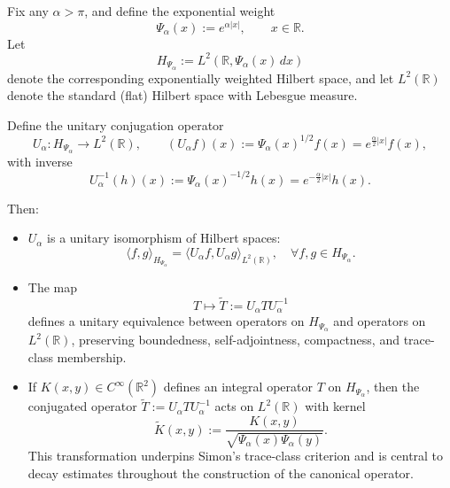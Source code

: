\begin{definition}
\label{def:unitary-conjugation-operator}
Fix any \( \alpha > \pi \), and define the exponential weight
\[
\Psi_\alpha(x) := e^{\alpha |x|}, \qquad x \in \mathbb{R}.
\]
Let
\[
H_{\Psi_\alpha} := L^2(\mathbb{R}, \Psi_\alpha(x)\, dx)
\]
denote the corresponding exponentially weighted Hilbert space, and let \( L^2(\mathbb{R}) \) denote the standard (flat) Hilbert space with Lebesgue measure.

Define the unitary conjugation operator
\[
U_\alpha \colon H_{\Psi_\alpha} \to L^2(\mathbb{R}), \qquad (U_\alpha f)(x) := \Psi_\alpha(x)^{1/2} f(x) = e^{\frac{\alpha}{2}|x|} f(x),
\]
with inverse
\[
U_\alpha^{-1}(h)(x) := \Psi_\alpha(x)^{-1/2} h(x) = e^{-\frac{\alpha}{2}|x|} h(x).
\]

Then:
\begin{itemize}
    \item \( U_\alpha \) is a unitary isomorphism of Hilbert spaces:
    \[
    \langle f, g \rangle_{H_{\Psi_\alpha}} = \langle U_\alpha f, U_\alpha g \rangle_{L^2(\mathbb{R})}, \quad \forall f, g \in H_{\Psi_\alpha}.
    \]

    \item The map
    \[
    T \mapsto \widetilde{T} := U_\alpha T U_\alpha^{-1}
    \]
    defines a unitary equivalence between operators on \( H_{\Psi_\alpha} \) and operators on \( L^2(\mathbb{R}) \), preserving boundedness, self-adjointness, compactness, and trace-class membership.

    \item If \( K(x,y) \in C^\infty(\mathbb{R}^2) \) defines an integral operator \( T \) on \( H_{\Psi_\alpha} \), then the conjugated operator \( \widetilde{T} := U_\alpha T U_\alpha^{-1} \) acts on \( L^2(\mathbb{R}) \) with kernel
    \[
    \widetilde{K}(x,y) := \frac{K(x,y)}{\sqrt{\Psi_\alpha(x)\Psi_\alpha(y)}}.
    \]
    This transformation underpins Simon’s trace-class criterion and is central to decay estimates throughout the construction of the canonical operator.
\end{itemize}
\end{definition}
